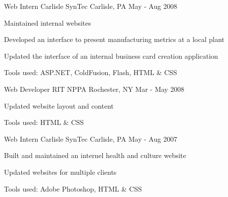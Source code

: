 \begin{cventries}
  \cventry
    {Web Intern}
    {Carlisle SynTec}
    {Carlisle, PA}
    {May - Aug 2008}
    {
      \begin{cvitems}
        \item {Maintained internal websites}
        \item {Developed an interface to present manufacturing metrics at a local plant}
        \item {Updated the interface of an internal business card creation application}
        \item {Tools used: ASP.NET, ColdFusion, Flash, HTML \& CSS}
      \end{cvitems}
    }

  \cventry
    {Web Developer}
    {RIT NPPA}
    {Rochester, NY}
    {Mar - May 2008}
    {
      \begin{cvitems}
        \item {Updated website layout and content}
        \item {Tools used: HTML \& CSS}
      \end{cvitems}
    }

  \cventry
    {Web Intern}
    {Carlisle SynTec}
    {Carlisle, PA}
    {May - Aug 2007}
    {
      \begin{cvitems}
        \item {Built and maintained an internel health and culture website}
        \item {Updated websites for multiple clients}
        \item {Tools used: Adobe Photoshop, HTML \& CSS}
      \end{cvitems}
    }
\end{cventries}
